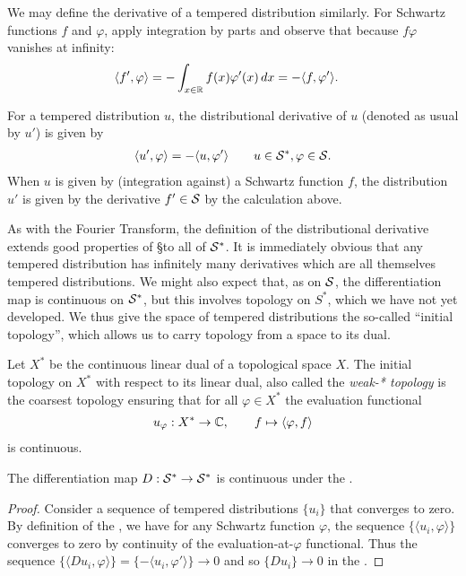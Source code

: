   We may define the derivative of a tempered distribution similarly.
  For Schwartz functions $f$ and $\varphi$, apply integration by parts and observe that because $f\varphi$ vanishes at infinity:
  \begin{align*}
    \langle f', \varphi\rangle
    &= -\int_{x\in\R} f(x)\varphi'(x)\,dx
    = -\langle f,\varphi'\rangle\text{.}
  \end{align*}
  \begin{defn}
    For a tempered distribution $u$, the distributional derivative of $u$ (denoted as usual by $u'$) is given by
    \begin{align*}
      \langle u', \varphi\rangle = -\langle u, \varphi'\rangle
      \qquad u\in\SS,\varphi\in\S \text{.}
    \end{align*}
    When $u$ is given by (integration against) a Schwartz function $f$, the distribution $u'$ is given by the derivative $f'\in\S$ by the calculation above. 
  \end{defn}
  
  As with the Fourier Transform, the definition of the distributional derivative extends good properties of \S to all of $\S^*$.
  It is immediately obvious that any tempered distribution has infinitely many derivatives which are all themselves tempered distributions.
  We might also expect that, as on $\S$, the differentiation map is continuous on $\S^*$, but this involves topology on $S^*$, which we have not yet developed.
  We thus give the space of tempered distributions the so-called ``initial topology'', which allows us to carry topology from a space to its dual.
  \begin{defn}
    Let $X^*$ be the continuous linear dual of a topological space $X$.
    The initial topology on $X^*$ with respect to its linear dual, also called the \emph{weak-* topology} is the coarsest topology ensuring that for all $\varphi\in X^*$ the evaluation functional
    \begin{gather*}
      u_\varphi: X^*\rightarrow\C, \qquad f\mapsto\langle\varphi,f\rangle
    \end{gather*}
    is continuous.
  \end{defn}

  \begin{claim}
    The differentiation map $D:\SS\rightarrow\SS$ is continuous under the \ws.
  \end{claim}
  \begin{proof}
    Consider a sequence of tempered distributions $\{u_i\}$ that converges to zero.
    By definition of the \ws, we have for any Schwartz function $\varphi$, the sequence $\{\langle u_i,\varphi\rangle\}$ converges to zero by continuity of the evaluation-at-$\varphi$ functional.
    Thus the sequence $ \{\langle Du_i, \varphi\rangle\} = \{-\langle u_i, \varphi'\rangle\} \rightarrow 0 $ and so $\{Du_i\}\rightarrow 0$ in the \ws.
  \end{proof}

